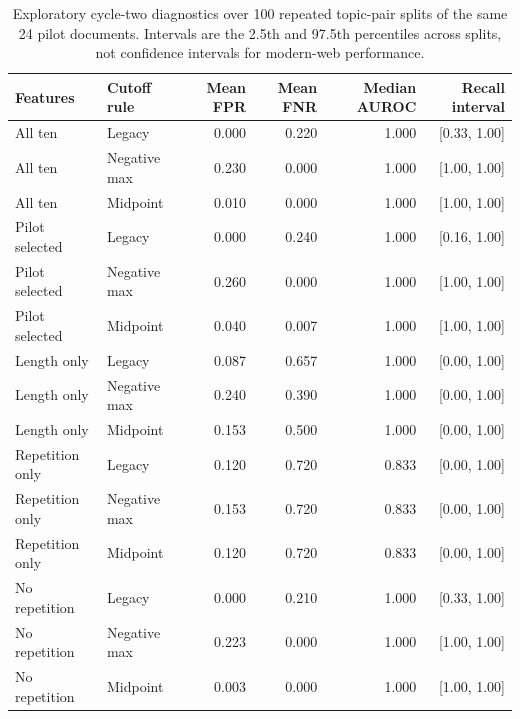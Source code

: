 \begin{table}[htbp]
\centering\small
\begin{tabular}{llrrrr}
\toprule
Features & Cutoff rule & Mean FPR & Mean FNR & Median AUROC & Recall interval \\
\midrule
All ten & Legacy & 0.000 & 0.220 & 1.000 & [0.33, 1.00] \\
All ten & Negative max & 0.230 & 0.000 & 1.000 & [1.00, 1.00] \\
All ten & Midpoint & 0.010 & 0.000 & 1.000 & [1.00, 1.00] \\
Pilot selected & Legacy & 0.000 & 0.240 & 1.000 & [0.16, 1.00] \\
Pilot selected & Negative max & 0.260 & 0.000 & 1.000 & [1.00, 1.00] \\
Pilot selected & Midpoint & 0.040 & 0.007 & 1.000 & [1.00, 1.00] \\
Length only & Legacy & 0.087 & 0.657 & 1.000 & [0.00, 1.00] \\
Length only & Negative max & 0.240 & 0.390 & 1.000 & [0.00, 1.00] \\
Length only & Midpoint & 0.153 & 0.500 & 1.000 & [0.00, 1.00] \\
Repetition only & Legacy & 0.120 & 0.720 & 0.833 & [0.00, 1.00] \\
Repetition only & Negative max & 0.153 & 0.720 & 0.833 & [0.00, 1.00] \\
Repetition only & Midpoint & 0.120 & 0.720 & 0.833 & [0.00, 1.00] \\
No repetition & Legacy & 0.000 & 0.210 & 1.000 & [0.33, 1.00] \\
No repetition & Negative max & 0.223 & 0.000 & 1.000 & [1.00, 1.00] \\
No repetition & Midpoint & 0.003 & 0.000 & 1.000 & [1.00, 1.00] \\
\bottomrule
\end{tabular}
\caption{Exploratory cycle-two diagnostics over 100 repeated topic-pair splits of the same 24 pilot documents. Intervals are the 2.5th and 97.5th percentiles across splits, not confidence intervals for modern-web performance.}
\end{table}